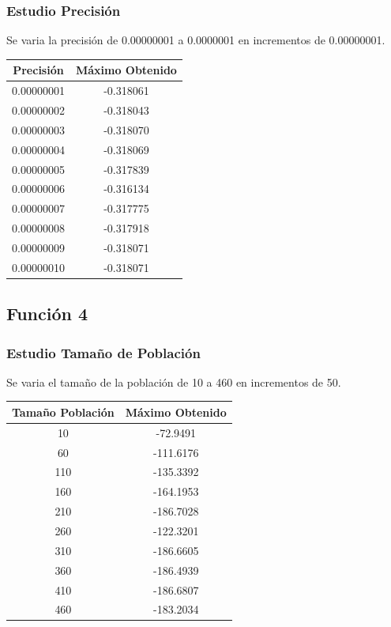 \documentclass[12pt]{article}
\begin{document}
\subsubsection*{Estudio Precisión}
	Se varia la precisión de 0.00000001 a 0.0000001 en incrementos de 0.00000001.
\begin{table}[H]
\begin{center}
\begin{tabular}{|cc|} \hline
Precisión & Máximo Obtenido \\  \hline
0.00000001 & -0.318061 \\ 
0.00000002 & -0.318043 \\ 
0.00000003 & -0.318070 \\
0.00000004 & -0.318069 \\
0.00000005 & -0.317839 \\
0.00000006 & -0.316134 \\
0.00000007 & -0.317775 \\
0.00000008 & -0.317918 \\ 
0.00000009 & -0.318071 \\
0.00000010 & -0.318071 \\  \hline
\end{tabular}
\end{center}
\end{table}

\subsection{Función 4}
\subsubsection*{Estudio Tamaño de Población}
	Se varia el tamaño de la población de 10 a 460 en incrementos de 50.
\begin{table}[H]
\begin{center}
\begin{tabular}{|cc|} \hline
Tamaño Población & Máximo Obtenido \\  \hline
10  & -72.9491 \\ 
60  & -111.6176 \\ 
110 & -135.3392 \\
160 & -164.1953 \\
210 & -186.7028 \\
260 & -122.3201 \\
310 & -186.6605 \\
360 & -186.4939 \\ 
410 & -186.6807 \\
460 & -183.2034 \\  \hline
\end{tabular}
\end{center}
\end{table}
 
\end{document}
